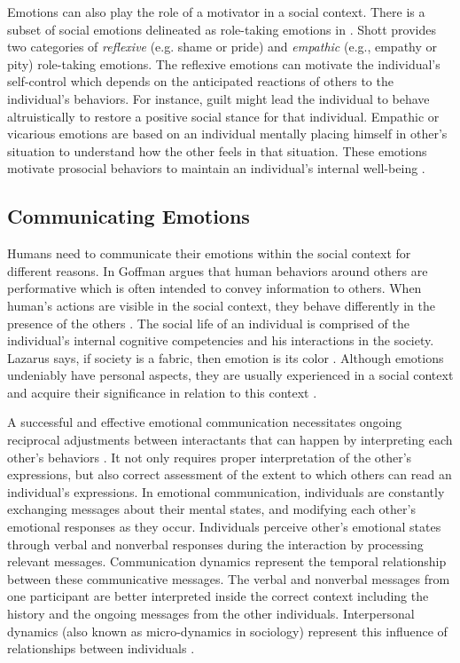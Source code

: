 \documentclass[11pt]{article}
\begin{document}
Emotions can also play the role of a motivator in a social context. There is a
subset of social emotions delineated as role-taking emotions in
\cite{shott:emotion-social-life}. Shott provides two categories of
\textit{reflexive} (e.g. shame or pride) and \textit{empathic} (e.g., empathy or
pity) role-taking emotions. The reflexive emotions can motivate the individual's
self-control which depends on the anticipated reactions of others to the
individual's behaviors. For instance, guilt might lead the individual to behave
altruistically to restore a positive social stance for that individual. Empathic
or vicarious emotions are based on an individual mentally placing himself in
other's situation to understand how the other feels in that situation. These
emotions motivate prosocial behaviors to maintain an individual's internal
well-being \cite{thoits:socialogy-emotion}.

\subsection{Communicating Emotions}

Humans need to communicate their emotions within the social context
for different reasons. In \cite{goffman:self-presentation} Goffman argues that
human behaviors around others are performative which is often intended to convey
information to others. When human's actions are visible in the social context,
they behave differently in the presence of the others
\cite{zajonc:social-facilitation}. The social life of an individual is comprised
of the individual's internal cognitive competencies and his interactions in the
society. Lazarus says, if society is a fabric, then emotion is its color
\cite{lazarus:emotion-adaptation}. Although emotions undeniably have personal
aspects, they are usually experienced in a social context and acquire their
significance in relation to this context
\cite{parkinson:emotion-social-interaction}.

A successful and effective emotional communication necessitates ongoing
reciprocal adjustments between interactants that can happen by interpreting each
other's behaviors \cite{parkinson:emotion-social-interaction}. It not only
requires proper interpretation of the other's expressions, but also correct
assessment of the extent to which others can read an individual's expressions.
In emotional communication, individuals are constantly exchanging messages about
their mental states, and modifying each other's emotional responses as they
occur. Individuals perceive other's emotional states through verbal and
nonverbal responses during the interaction by processing relevant messages.
Communication dynamics represent the temporal relationship between these
communicative messages. The verbal and nonverbal messages from one participant
are better interpreted inside the correct context including the history and the
ongoing messages from the other individuals. Interpersonal dynamics (also known
as micro-dynamics in sociology) represent this influence of relationships
between individuals \cite{louis:communication-dynamic}.
\end{document}
